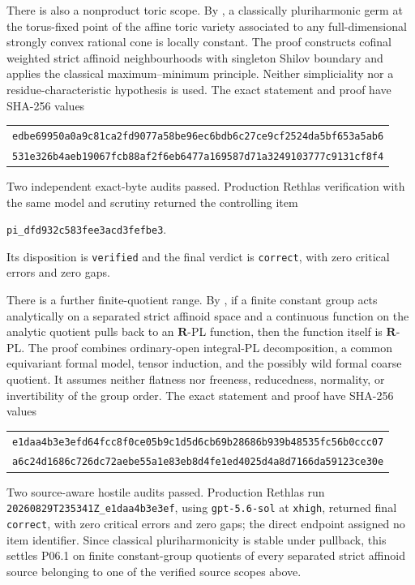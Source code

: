 There is also a nonproduct toric scope.  By
, a classically pluriharmonic germ
at the torus-fixed point of the affine toric variety associated to any
full-dimensional strongly convex rational cone is locally constant.  The
proof constructs cofinal weighted strict affinoid neighbourhoods with
singleton Shilov boundary and applies the classical maximum--minimum
principle.  Neither simpliciality nor a residue-characteristic hypothesis is
used.  The exact statement and proof have SHA-256 values
\begin{center}
\small
\begin{tabular}{@{}c@{}}
\nolinkurl{edbe69950a0a9c81ca2fd9077a58be96ec6bdb6c27ce9cf2524da5bf653a5ab6}\\
\nolinkurl{531e326b4aeb19067fcb88af2f6eb6477a169587d71a3249103777c9131cf8f4}
\end{tabular}
\end{center}
Two independent exact-byte audits passed.  Production Rethlas verification
with the same model and scrutiny returned the controlling item
\begin{center}
\small
\nolinkurl{pi_dfd932c583fee3acd3fefbe3}.
\end{center}
Its disposition is \texttt{verified} and the final verdict is
\texttt{correct}, with zero critical errors and zero gaps.

There is a further finite-quotient range.  By
, if a finite constant
group acts analytically on a separated strict affinoid space and a continuous
function on the analytic quotient pulls back to an $\mathbf R$-PL function,
then the function itself is $\mathbf R$-PL.  The proof combines
ordinary-open integral-PL decomposition, a common equivariant formal model,
tensor induction, and the possibly wild formal coarse quotient.  It assumes
neither flatness nor freeness, reducedness, normality, or invertibility of the
group order.  The exact statement and proof have SHA-256 values
\begin{center}
\small
\begin{tabular}{@{}c@{}}
\nolinkurl{e1daa4b3e3efd64fcc8f0ce05b9c1d5d6cb69b28686b939b48535fc56b0ccc07}\\
\nolinkurl{a6c24d1686c726dc72aebe55a1e83eb8d4fe1ed4025d4a8d7166da59123ce30e}
\end{tabular}
\end{center}
Two source-aware hostile audits passed.  Production Rethlas run
\nolinkurl{20260829T235341Z_e1daa4b3e3ef}, using
\texttt{gpt-5.6-sol} at \texttt{xhigh}, returned final
\texttt{correct}, with zero critical errors and zero gaps; the direct
endpoint assigned no item identifier.  Since classical pluriharmonicity is
stable under pullback, this settles P06.1 on finite constant-group quotients
of every separated strict affinoid source belonging to one of the verified
source scopes above.

